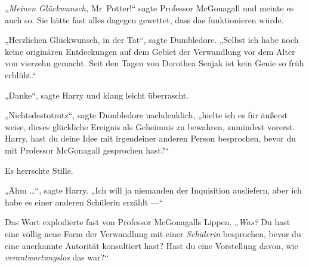 „\emph{Meinen Glückwunsch,} Mr~Potter!“ sagte Professor McGonagall und meinte es auch so. Sie hätte fast alles dagegen gewettet, dass das funktionieren würde.

„Herzlichen Glückwunsch, in der Tat“, sagte Dumbledore.
„Selbst ich habe noch keine originären Entdeckungen auf dem Gebiet der Verwandlung vor dem Alter von vierzehn gemacht. Seit den Tagen von Dorothea Senjak ist kein Genie so früh erblüht.“%

„Danke“, sagte Harry und klang leicht überrascht.

„Nichtsdestotrotz“, sagte Dumbledore nachdenklich, „hielte ich es für äußerst weise, dieses glückliche Ereignis als Geheimnis zu bewahren, zumindest vorerst. Harry, hast du deine Idee mit irgendeiner anderen Person besprochen, bevor du mit Professor McGonagall gesprochen hast?“

Es herrschte Stille.

„Ähm …“, sagte Harry.
„Ich will ja niemanden der Inquisition ausliefern, aber ich habe es einer anderen Schülerin erzählt —“

Das Wort explodierte fast von Professor McGonagalls Lippen.
„\emph{Was?} Du hast eine völlig neue Form der Verwandlung mit einer \emph{Schülerin} besprochen, bevor du eine anerkannte Autorität konsultiert hast? Hast du eine Vorstellung davon, wie \emph{verantwortungslos} das war?“

